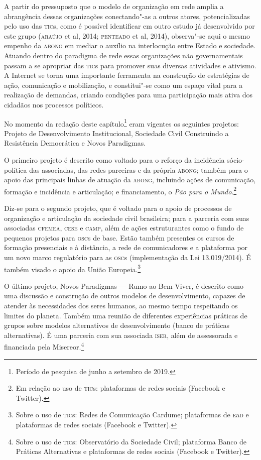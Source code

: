 A partir do pressuposto que o modelo de organização em rede amplia a
abrangência dessas organizações conectando"-as a outros atores,
potencializadas pelo uso das \textsc{tic}s, como é possível identificar em outro
estudo já desenvolvido por este grupo (\textsc{araújo} et al, 2014; \textsc{penteado} et
al, 2014), observa"-se aqui o mesmo empenho da \textsc{abong} em mediar o auxílio
na interlocução entre Estado e sociedade. Atuando dentro do paradigma de
rede essas organizações não governamentais passam a se apropriar das
\textsc{tic}s para promover suas diversas atividades e ativismo. A Internet se
torna uma importante ferramenta na construção de estratégias de ação,
comunicação e mobilização, e constitui"-se como um espaço vital para a
realização de demandas, criando condições para uma participação mais
ativa dos cidadãos nos processos políticos.

No momento da redação deste capítulo\footnote{Período de pesquisa de
  junho a setembro de 2019.} eram vigentes os seguintes projetos:
Projeto de Desenvolvimento Institucional, Sociedade Civil Construindo
a Resistência Democrática e Novos Paradigmas. 

O primeiro projeto é descrito como voltado para o reforço da
incidência sócio-política das associadas, das redes parceiras e da própria \textsc{abong}; também para o 
apoio das principais linhas de atuação da \textsc{abong}, incluindo
ações de comunicação, formação e incidência e articulação; e financiamento, o \textit{Pão para o Mundo}.\footnote{ Em relação ao uso de \textsc{tic}s: plataformas de redes sociais (Facebook e Twitter).}

Diz-se para o segundo projeto, que é voltado para o apoio de
processos de organização e articulação da sociedade civil brasileira;
para a parceria com suas associadas \textsc{cfemea, cese} e \textsc{camp}, além de 
ações estruturantes como o fundo de pequenos projetos para \textsc{osc}s
de base. Estão também presentes os cursos de formação presenciais e à distância, a rede de
comunicadores e a plataforma por um novo marco regulatório
para as \textsc{osc}s (implementação da Lei 13.019/2014). É também visado o apoio da União Europeia.\footnote{Sobre o uso de \textsc{tic}s: Redes de Comunicação Cardume; plataformas de \textsc{e}a\textsc{d} e plataformas de redes sociais (Facebook e Twitter).}

O último projeto, Novos Paradigmas --- Rumo ao Bem Viver, é descrito como 
uma discussão e construção de outros modelos de desenvolvimento, capazes de atender
às necessidades dos seres humanos, ao mesmo tempo respeitando os
limites do planeta. Também uma reunião de diferentes experiências práticas de grupos sobre modelos
alternativos de desenvolvimento (banco de práticas alternativas). É uma parceria com sua associada \textsc{iser}, além de assessorada e financiada pela Misereor.\footnote{Sobre o uso de \textsc{tic}s: Observatório da Sociedade Civil; plataforma Banco de Práticas Alternativas e plataformas de redes sociais (Facebook e Twitter).}

